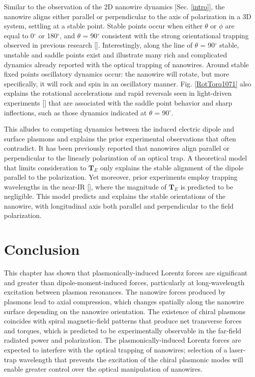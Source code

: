 Similar to the observation of the 2D nanowire dynamics [Sec. \ref{intro}], the nanowire aligns either parallel or perpendicular to the axis of polarization in a 3D system, settling at a stable point. Stable points occur when either $\theta$ or $\phi$ are equal to 0$^\circ$ or 180$^\circ$, and $\theta$ = 90$^\circ$ consistent with the strong orientational trapping observed in previous research [\cite{Yan2012a,Tong}]. Interestingly, along the line of $\theta$ = 90$^\circ$ stable, unstable and saddle points exist and illustrate many rich and complicated dynamics already reported with the optical trapping of nanowires. Around stable fixed points oscillatory dynamics occur: the nanowire will rotate, but more specifically, it will rock and spin in an oscillatory manner. Fig. \ref{RotTorq1071} also explains the rotational accelerations and rapid reversals seen in light-driven experiments [\cite{Shelton2005}] that are associated with the saddle point behavior and sharp inflections, such as those dynamics indicated at $\theta$ = 90$^\circ$.

This alludes to competing dynamics between the induced electric dipole and surface plasmons and explains the prior experimental observations that often contradict. It has been previously reported that nanowires align parallel or perpendicular to the linearly polarization of an optical trap. A theoretical model that limits consideration to $\mathbf{T}_E$ only explains the stable alignment of the dipole parallel to the polarization. Yet moreover, prior experiments employ trapping wavelengths in the near-IR [\cite{Tong}], where the magnitude of $\mathbf{T}_E$ is predicted to be negligible. This model predicts and explains the stable orientations of the nanowire, with longitudinal axis both parallel and perpendicular to the field polarization.

\section{Conclusion} \label{conclusion}
This chapter has shown that plasmonically-induced Lorentz forces are significant and greater than dipole-moment-induced forces, particularly at long-wavelength excitation between plasmon resonances.  The nanowire forces produced by plasmons lead to axial compression, which changes spatially along the nanowire surface depending on the nanowire orientation.  The existence of chiral plasmons coincides with spiral magnetic-field patterns that produce net transverse forces and torques, which is predicted to be experimentally observable in the far-field radiated power and polarization.  The plasmonically-induced Lorentz forces are expected to interfere with the optical trapping of nanowires; selection of a laser-trap wavelength that prevents the excitation of the chiral plasmonic modes will enable greater control over the optical manipulation of nanowires.

